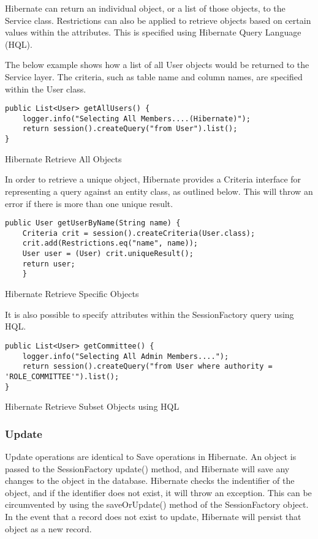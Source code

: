 Hibernate can return an individual object, or a list of those objects, to the Service class. Restrictions can also be applied to retrieve objects based on certain values within the attributes. This is specified using Hibernate Query Language (HQL).

The below example shows how a list of all User objects would be returned to the Service layer. The criteria, such as table name and column names, are specified within the User class. 

\begin{table}[H]
\begin{lstlisting}
public List<User> getAllUsers() {
	logger.info("Selecting All Members....(Hibernate)");
	return session().createQuery("from User").list();
}
\end{lstlisting}
\caption{Hibernate Retrieve All Objects }
\end{table}

In order to retrieve a unique object, Hibernate provides a Criteria interface for representing a query against an entity class, as outlined below. This will throw an error if there is more than one unique result. 

\begin{table}[H]
\begin{lstlisting}
public User getUserByName(String name) {
	Criteria crit = session().createCriteria(User.class);
	crit.add(Restrictions.eq("name", name)); 
	User user = (User) crit.uniqueResult();
	return user;
	}
\end{lstlisting}
\caption{Hibernate Retrieve Specific Objects }
\end{table}

It is also possible to specify attributes within the SessionFactory query using HQL. 

\begin{table}[H]
\begin{lstlisting}
public List<User> getCommittee() {
	logger.info("Selecting All Admin Members....");
	return session().createQuery("from User where authority = 'ROLE_COMMITTEE'").list();
}
\end{lstlisting}
\caption{Hibernate Retrieve Subset Objects using HQL }
\end{table}

\subsubsection{Update}

Update operations are identical to Save operations in Hibernate. An object is passed to the SessionFactory update() method, and Hibernate will save any changes to the object in the database. Hibernate checks the indentifier of the object, and if the identifier does not exist, it will throw an exception. This can be circumvented by using the saveOrUpdate() method of the SessionFactory object. In the event that a record does not exist to update, Hibernate will persist that object as a new record.

